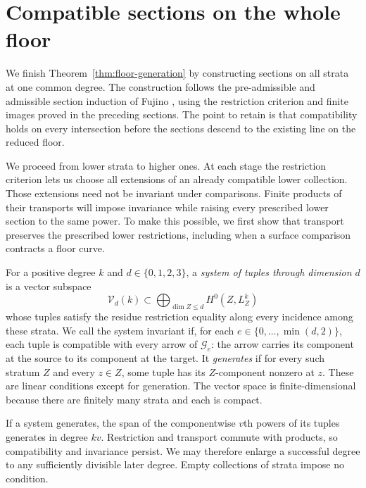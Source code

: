 \section{Compatible sections on the whole floor}\label{sec:gluing}

We finish Theorem~\ref{thm:floor-generation} by constructing sections on
all strata at one common degree.  The construction follows the
pre-admissible and admissible section induction of Fujino
\cite[Section~4]{Fujino2000}, using the restriction criterion and finite
images proved in the preceding sections.  The point to retain is that
compatibility holds on every intersection before the sections descend to
the existing line on the reduced floor.

We proceed from lower strata to higher ones.  At each stage the restriction
criterion lets us choose all extensions of an already compatible lower
collection.  Those extensions need not be invariant under comparisons.
Finite products of their transports will impose invariance while raising
every prescribed lower section to the same power.  To make this possible,
we first show that transport preserves the prescribed lower restrictions,
including when a surface comparison contracts a floor curve.

For a positive degree \(k\) and \(d\in\{0,1,2,3\}\), a \emph{system of
tuples through dimension \(d\)} is a vector subspace
\[
 \mathcal V_d(k)\subset
 \bigoplus_{\dim Z\leq d} H^0(Z,L_Z^k)
\]
whose tuples satisfy the residue restriction equality along every
incidence among these strata.  We call the system invariant if, for each
\(e\in\{0,\ldots,\min(d,2)\}\), each tuple is compatible with every
arrow of \(\mathcal G_e\): the arrow carries its component at the source
to its component at the target.  It \emph{generates} if for every such
stratum \(Z\) and every \(z\in Z\), some tuple has its \(Z\)-component
nonzero at \(z\).  These are linear conditions except for generation.
The vector space is finite-dimensional because there are finitely many
strata and each is compact.

If a system generates, the span of the componentwise \(v\)th powers
of its tuples generates in degree \(kv\).  Restriction and transport
commute with products, so compatibility and invariance persist.  We may
therefore enlarge a successful degree to any sufficiently divisible later
degree.  Empty collections of strata impose no condition.


